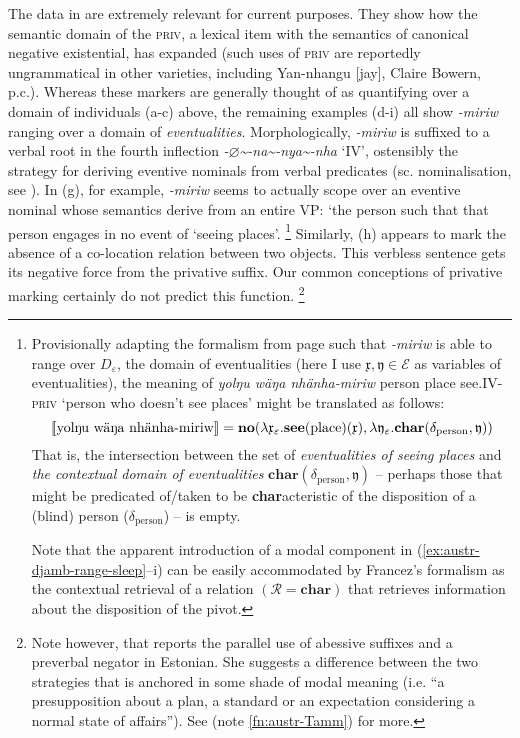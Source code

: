 \documentclass[output=paper,draft,draftmode,colorlinks,citecolor=brown]{langscibook}
\begin{document}
The data in  are extremely relevant for current
    purposes. They show how the semantic domain of the \textsc{priv}, a
    lexical item with the semantics of canonical negative existential, has
    expanded (such uses of \textsc{priv} are reportedly ungrammatical in
    other varieties, including Yan-nhangu [jay], Claire
    Bowern, p.c.). Whereas these markers are generally thought of as
    quantifying over a domain of individuals (a-c) above, the remaining
    examples (d-i) all show \textit{-miriw} ranging over a domain of
    \textit{eventualities}. Morphologically, \mbox{\textit{-miriw}} is
    suffixed to a verbal root in the fourth inflection
    \textit{-$\varnothing$\textasciitilde-na\textasciitilde-nya\textasciitilde-nha}
    `IV', ostensibly the strategy for deriving eventive nominals from
    verbal predicates (sc. nominalisation, see \citealt[103]{Lowe1996}). In
    (g), for example, \textit{-miriw} seems to actually scope over an
    eventive nominal whose semantics derive from an entire VP: `the person
    such that that person engages in no event of `seeing places'.%
%
\footnote{Provisionally adapting the formalism from page \pageref{sec:austr-2.2} such that \textit{-miriw} is able to range over $D_\varepsilon$, the domain of eventualities (here I use $\mathfrak{x,y}\in\mathcal E$ as variables of eventualities), the meaning of \textit{yolŋu wäŋa nhänha-miriw} person place see.IV\textsc{-priv} `person who doesn't see places' might be translated as follows:	
	$$\mbox{$[\![\mbox{yolŋu wäŋa nhänha-miriw}]\!]$} =\textbf{no}(\lambda\mathfrak x_\varepsilon.\textbf{see}(\text{place})(\mathfrak x),\lambda\mathfrak y_\varepsilon.\textbf{char}(\delta_{\text{person}},\mathfrak y))$$
That is, the intersection between the set of \textit{eventualities of seeing places} and \textit{the contextual domain of eventualities} $\textbf{char}(\delta_{\text{person}},\mathfrak y)$ -- perhaps those that might be predicated of\slash taken to be \textbf{char}acteristic of the disposition of a (blind) person ($\delta_\text{person}$) -- is empty.
	
Note that the apparent introduction of a modal component in
(\ref{ex:austr-djamb-range-sleep}--i) can be easily accommodated by Francez's \citeyearpar{Francez2007} formalism as the contextual retrieval of a relation $(\mathcal R=\textbf{char})$ that retrieves information about the disposition of the pivot.}
%
Similarly, (h) appears to mark the absence of a co-location relation
between two objects. This verbless sentence gets its negative force from
the privative suffix. Our common conceptions of privative marking certainly
do not predict this function.%
%
\footnote{Note however, that \citet{Tamm2009,Tamm2015} reports the parallel
use of abessive suffixes and a preverbal negator in Estonian. She suggests a difference between the two strategies that is anchored in some shade of modal meaning (i.e. ``a presupposition about a plan, a standard or an expectation considering a normal state of affairs''). See  (note \ref{fn:austr-Tamm}) for more.}
\end{document}
